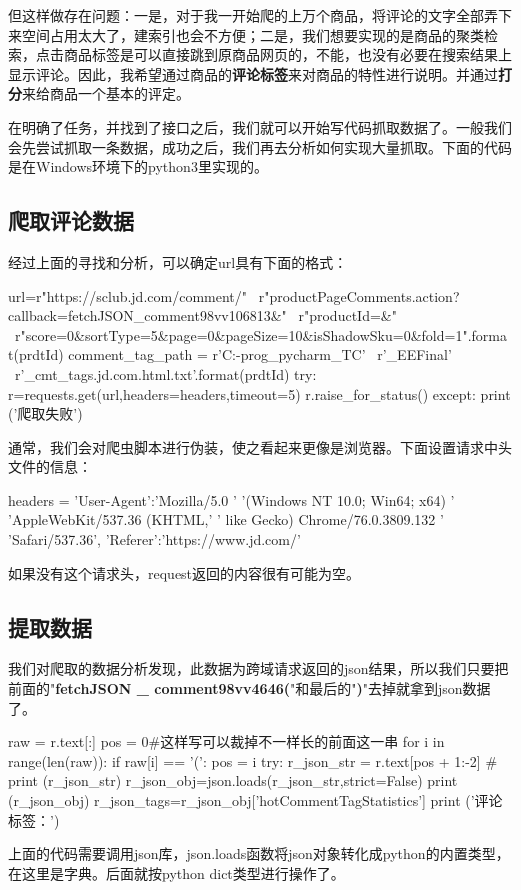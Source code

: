 但这样做存在问题：一是，对于我一开始爬的上万个商品，将评论的文字全部弄下来空间占用太大了，建索引也会不方便；二是，我们想要实现的是商品的聚类检索，点击商品标签是可以直接跳到原商品网页的，不能，也没有必要在搜索结果上显示评论。因此，我希望通过商品的\textbf{评论标签}来对商品的特性进行说明。并通过\textbf{打分}来给商品一个基本的评定。

在明确了任务，并找到了接口之后，我们就可以开始写代码抓取数据了。一般我们会先尝试抓取一条数据，成功之后，我们再去分析如何实现大量抓取。下面的代码是在Windows环境下的python3里实现的。

\subsection{爬取评论数据}
经过上面的寻找和分析，可以确定url具有下面的格式：
\begin{python}
url=r"https://sclub.jd.com/comment/" \
    r"productPageComments.action?callback=fetchJSON_comment98vv106813&" \
    r"productId={}&" \
    r"score=0&sortType=5&page=0&pageSize=10&isShadowSku=0&fold=1".format(prdtId)
comment_tag_path = r'C:\TC-prog\JetBrain_pycharm_TC' \
                   r'\PycharmProjects\Crawler_EEFinal' \
                   r'\jd_cmt_tags\httpsitem.jd.com{}.html.txt'.format(prdtId)
try:
    r=requests.get(url,headers=headers,timeout=5)
    r.raise_for_status()
except:
    print ('爬取失败')
\end{python}
通常，我们会对爬虫脚本进行伪装，使之看起来更像是浏览器。下面设置请求中头文件的信息：
\begin{python}
headers = {'User-Agent':'Mozilla/5.0 '
                        '(Windows NT 10.0; Win64; x64) '
                        'AppleWebKit/537.36 (KHTML,'
                        ' like Gecko) Chrome/76.0.3809.132 '
                        'Safari/537.36',
                        'Referer':'https://www.jd.com/'
}
\end{python}
如果没有这个请求头，request返回的内容很有可能为空。

\subsection{提取数据}
我们对爬取的数据分析发现，此数据为跨域请求返回的json结果，所以我们只要把前面的"\textbf{fetchJSON \_ comment98vv4646(}"和最后的"\textbf{)}"去掉就拿到json数据了。

\begin{python}
raw = r.text[:]
pos = 0#这样写可以裁掉不一样长的前面这一串
for i in range(len(raw)):
    if raw[i] == '(':
        pos = i
try:
    r_json_str = r.text[pos + 1:-2]
    # print (r_json_str)
    r_json_obj=json.loads(r_json_str,strict=False)
    print (r_json_obj)
    r_json_tags=r_json_obj['hotCommentTagStatistics']
    print ('评论标签：')
\end{python}
上面的代码需要调用json库，json.loads函数将json对象转化成python的内置类型，在这里是字典。后面就按python dict类型进行操作了。

